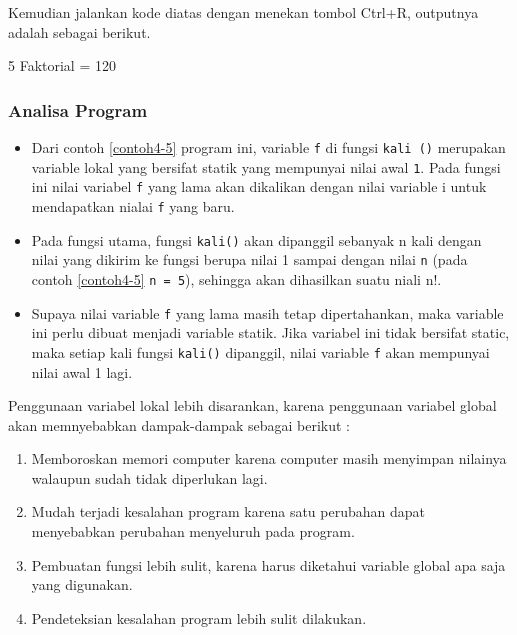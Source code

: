 Kemudian jalankan kode diatas dengan menekan tombol Ctrl+R, outputnya
adalah sebagai berikut.

\begin{lcverbatim}
5 Faktorial = 120
\end{lcverbatim}

\subsubsection*{Analisa Program}

\begin{itemize}

\item
 Dari contoh \ref{contoh4-5} program ini, variable \texttt{f} di fungsi
 \texttt{kali\ ()} merupakan variable lokal yang bersifat statik yang
 mempunyai nilai awal \texttt{1}. Pada fungsi ini nilai variabel
 \texttt{f} yang lama akan dikalikan dengan nilai variable i untuk
 mendapatkan nialai \texttt{f} yang baru.\\
\item
 Pada fungsi utama, fungsi \texttt{kali()} akan dipanggil sebanyak n
 kali dengan nilai yang dikirim ke fungsi berupa nilai 1 sampai dengan
 nilai \texttt{n} (pada contoh \ref{contoh4-5} \texttt{n\ =\ 5}), sehingga akan
 dihasilkan suatu niali n!.\\
\item
 Supaya nilai variable \texttt{f} yang lama masih tetap dipertahankan,
 maka variable ini perlu dibuat menjadi variable statik. Jika variabel
 ini tidak bersifat static, maka setiap kali fungsi \texttt{kali()}
 dipanggil, nilai variable \texttt{f} akan mempunyai nilai awal 1 lagi.
\end{itemize}

Penggunaan variabel lokal lebih disarankan, karena penggunaan variabel
global akan memnyebabkan dampak-dampak sebagai berikut :

\begin{enumerate}


\item
 Memboroskan memori computer karena computer masih menyimpan nilainya
 walaupun sudah tidak diperlukan lagi.
\item
 Mudah terjadi kesalahan program karena satu perubahan dapat
 menyebabkan perubahan menyeluruh pada program.
\item
 Pembuatan fungsi lebih sulit, karena harus diketahui variable global
 apa saja yang digunakan.
\item
 Pendeteksian kesalahan program lebih sulit dilakukan.
\end{enumerate}

